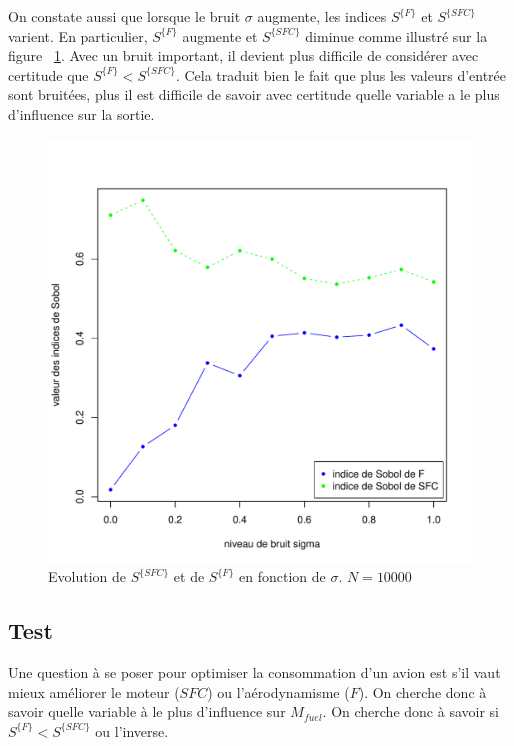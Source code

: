 \documentclass{article}
\begin{document}
\medbreak
On constate aussi que lorsque le bruit $\sigma$ augmente, les indices $S^{\{F\}}$ et $S^{\{SFC\}}$ varient. En particulier, $S^{\{F\}}$ augmente et $S^{\{SFC\}}$ diminue comme illustré sur la figure ~\ref{sobol_b}. Avec un bruit important, il devient plus difficile de considérer avec certitude que $S^{\{F\}} < S^{\{SFC\}}$. Cela traduit bien le fait que plus les valeurs d'entrée sont bruitées, plus il est difficile de savoir avec certitude quelle variable a le plus d'influence sur la sortie. 
\begin{figure}[!h]
\begin{center}
    \includegraphics[scale=0.7]{Sobol_b.pdf}
    \caption{Evolution de $S^{\{SFC\}}$ et de $S^{\{F\}}$ en fonction de $\sigma$. $N=10000$}
    \label{sobol_b}
\end{center}
\end{figure}
\subsection{Test}
Une question à se poser pour optimiser la consommation d'un avion est s'il vaut mieux améliorer le moteur ($SFC$) ou l'aérodynamisme ($F$). On cherche donc à savoir quelle variable à le plus d'influence sur $M_{fuel}$. On cherche donc à savoir si $S^{\{F\}} < S^{\{SFC\}}$ ou l'inverse.
\end{document}

